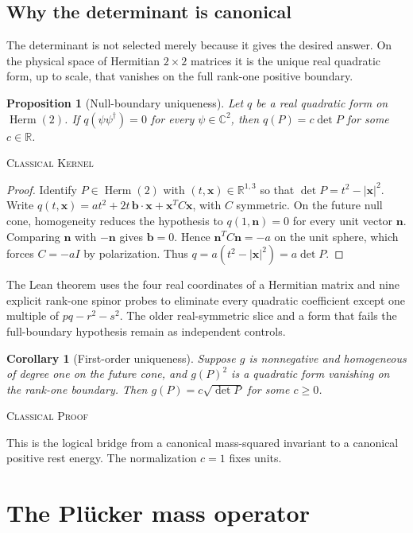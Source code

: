 \documentclass[11pt]{article}
\newcommand{\Kernel}{\textcolor{kernelcolor}{\textsc{Kernel}}}
\newcommand{\Human}{\textcolor{humanproofcolor}{\textsc{Proof}}}
\newcommand{\Classical}{\textcolor{classicalcolor}{\textsc{Classical}}}
\newcommand{\C}{\mathbb{C}}
\newcommand{\R}{\mathbb{R}}
\newtheorem{proposition}[theorem]{Proposition}
\newtheorem{corollary}[theorem]{Corollary}
\begin{document}
\subsection{Why the determinant is canonical}

The determinant is not selected merely because it gives the desired answer.
On the physical space of Hermitian $2\times2$ matrices it is the unique real
quadratic form, up to scale, that vanishes on the full rank-one positive
boundary.

\begin{proposition}[Null-boundary uniqueness]\label{prop:unique}
Let $q$ be a real quadratic form on $\operatorname{Herm}(2)$.  If
$q(\psi\psi^\dagger)=0$ for every $\psi\in\C^2$, then
$q(P)=c\det P$ for some $c\in\R$.
\end{proposition}
\noindent\Classical{} \Kernel{}

\begin{proof}
Identify $P\in\operatorname{Herm}(2)$ with $(t,\mathbf x)\in\R^{1,3}$ so that
$\det P=t^2-|\mathbf x|^2$.  Write
$q(t,\mathbf x)=a t^2+2t\,\mathbf b\cdot\mathbf x+\mathbf x^T C\mathbf x$,
with $C$ symmetric.  On the future null cone, homogeneity reduces the
hypothesis to $q(1,\mathbf n)=0$ for every unit vector $\mathbf n$.  Comparing
$\mathbf n$ with $-\mathbf n$ gives $\mathbf b=0$.  Hence
$\mathbf n^TC\mathbf n=-a$ on the unit sphere, which forces $C=-aI$ by
polarization.  Thus $q=a(t^2-|\mathbf x|^2)=a\det P$.
\end{proof}

The Lean theorem uses the four real coordinates of a Hermitian matrix and nine
explicit rank-one spinor probes to eliminate every quadratic coefficient except
one multiple of $pq-r^2-s^2$.  The older real-symmetric slice and a form that
fails the full-boundary hypothesis remain as independent controls.

\begin{corollary}[First-order uniqueness]
Suppose $g$ is nonnegative and homogeneous of degree one on the future cone,
and $g(P)^2$ is a quadratic form vanishing on the rank-one boundary.  Then
$g(P)=c\sqrt{\det P}$ for some $c\geq0$.
\end{corollary}
\noindent\Classical{} \Human{}

This is the logical bridge from a canonical mass-squared invariant to a
canonical positive rest energy.  The normalization $c=1$ fixes units.

\section{The Pl\"ucker mass operator}
\end{document}
